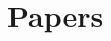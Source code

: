 \documentclass[
	paper=16.9cm:23.9cm,
	pagesize,
	twoside,
	10pt,
	chapterprefix,
	headsepline=on,
	footinclude=off,
	DIV=18,
	BCOR=7mm,
	bibliography=totoc,
	numbers=noenddot,
	open=right,
]{scrreprt}
\begin{document}
\part{Papers}
\setcounter{secnumdepth}{2}

\initpapers
\renewcommand\bibname{References}

\renewcommand\sectionmark[1]{\markright{\MakeMarkcase {\thesection\hskip .5em\relax#1}}}
\rohead{\rightmark}
\rofoot{\pagemark}
\lefoot{\pagemark}







\end{document}
